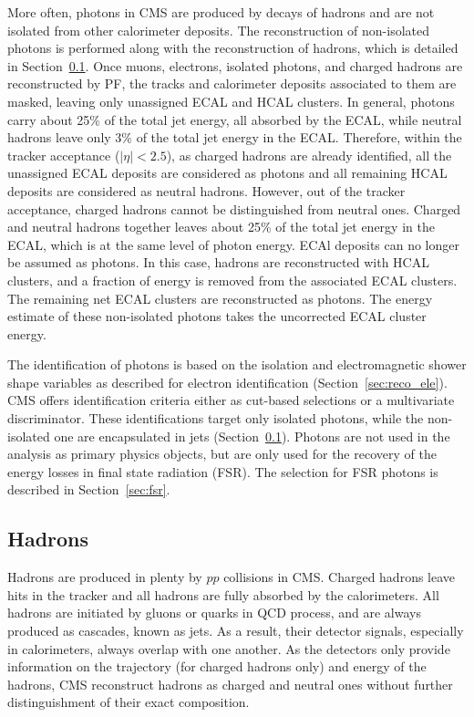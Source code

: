 More often, photons in CMS are produced by decays of hadrons 
and are not isolated from other calorimeter deposits.
The reconstruction of non-isolated photons is performed along with the reconstruction of hadrons, 
which is detailed in Section~\ref{sec:reco_had}.
Once muons, electrons, isolated photons, and charged hadrons are reconstructed by PF, 
the tracks and calorimeter deposits associated to them are masked,
leaving only unassigned ECAL and HCAL clusters.
In general, photons carry about 25\% of the total jet energy, all absorbed by the ECAL,
while neutral hadrons leave only 3\% of the total jet energy in the ECAL.
Therefore, within the tracker acceptance ($|\eta| < 2.5$), as charged hadrons are already identified,
all the unassigned ECAL deposits are considered as photons and all remaining HCAL deposits are considered as neutral hadrons.  
However, out of the tracker acceptance, charged hadrons cannot be distinguished from neutral ones.
Charged and neutral hadrons together leaves about 25\% of the total jet energy in the ECAL,
which is at the same level of photon energy.
ECAl deposits can no longer be assumed as photons.
In this case, hadrons are reconstructed with HCAL clusters, 
and a fraction of energy is removed from the associated ECAL clusters.
The remaining net ECAL clusters are reconstructed as photons.
The energy estimate of these non-isolated photons takes the uncorrected ECAL cluster energy. 

The identification of photons is based on the isolation and electromagnetic shower shape variables as described for electron identification (Section~\ref{sec:reco_ele}).
CMS offers identification criteria either as cut-based selections or a multivariate discriminator.
These identifications target only isolated photons, while the non-isolated one are encapsulated in jets (Section~\ref{sec:reco_had}).
Photons are not used in the \hmm analysis as primary physics objects, but are only used for the recovery of the energy losses in final state radiation (FSR).
The selection for FSR photons is described in Section~\ref{sec:fsr}. 

\subsection{Hadrons}\label{sec:reco_had}

Hadrons are produced in plenty by $pp$ collisions in CMS.
Charged hadrons leave hits in the tracker and all hadrons are fully absorbed by the calorimeters.
All hadrons are initiated by gluons or quarks in QCD process, and are always produced as cascades, known as jets.
As a result, their detector signals, especially in calorimeters, always overlap with one another.
As the detectors only provide information on the trajectory (for charged hadrons only) and energy of the hadrons,
CMS reconstruct hadrons as charged and neutral ones without further distinguishment of their exact composition.

